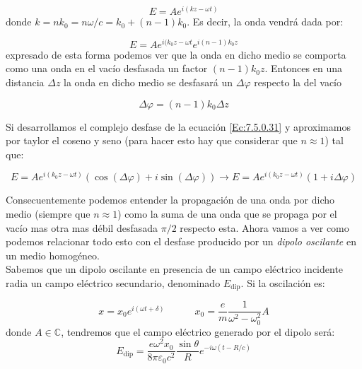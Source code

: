 \documentclass[12pt,a4paper]{article}
\newcommand{\tquad}{\quad \quad \quad}
\numberwithin{equation}{section}
\numberwithin{figure}{section}
\begin{document}
\begin{equation}
E = A e^{i (kz-\omega t)}
\end{equation}
donde $k = n k_0 = n \omega/c = k_0 + (n-1) k_0$. Es decir, la onda vendrá dada por:

\begin{equation}
E = A e^{i (k_0z-\omega t} e^{i (n-1)k_0 z} \label{Ec:7.5.0.31}
\end{equation}
expresado de esta forma podemos ver que la onda en dicho medio se comporta como una onda en el vacío desfasada un factor $(n-1)k_0 z$. Entonces en una distancia $\Delta z$ la onda en dicho medio se desfasará un $\Delta \varphi$ respecto la del vacío 

\begin{equation}
\Delta \varphi = (n-1)k_0 \Delta z
\end{equation}

Si desarrollamos el complejo desfase de la ecuación \ref{Ec:7.5.0.31} y aproximamos por taylor el coseno y seno (para hacer esto hay que considerar que $n \approx 1$) tal que:

\begin{equation}
E=A e^{i (k_0z-\omega t)}  ( \cos (\Delta \varphi) + i  \sin (\Delta \varphi) ) \longrightarrow E = A e^{i (k_0z-\omega t)}  (	1+ i\Delta \varphi )
\end{equation}

Consecuentemente podemos entender la propagación de una onda por dicho medio (siempre que $n \approx 1$) como la suma de una onda que se propaga por el vacío mas 
otra mas débil desfasada $\pi/2$ respecto esta. Ahora vamos a ver como podemos relacionar todo esto con el desfase producido por un \textit{dipolo oscilante} en un medio homogéneo. \\

Sabemos que un dipolo oscilante en presencia de un campo eléctrico incidente radia un campo eléctrico secundario, denominado $E_{\mathrm{dip}}$. Si la oscilación es:

\begin{equation}
x = x_0 e^{i (\omega t + \delta)} \tquad x_0 = \dfrac{e}{m} \dfrac{1}{\omega^2-\omega_0^2} A
\end{equation}
donde $A \in \mathbb{C}$, tendremos que el campo eléctrico generado por el dipolo será:
\begin{equation}
E_{\mathrm{dip}} = \dfrac{e \omega^2 x_0}{8 \pi \varepsilon_0 c^2} \dfrac{\sin \theta}{R} e^{-i \omega (t - R/c)}
\end{equation}
\end{document}
